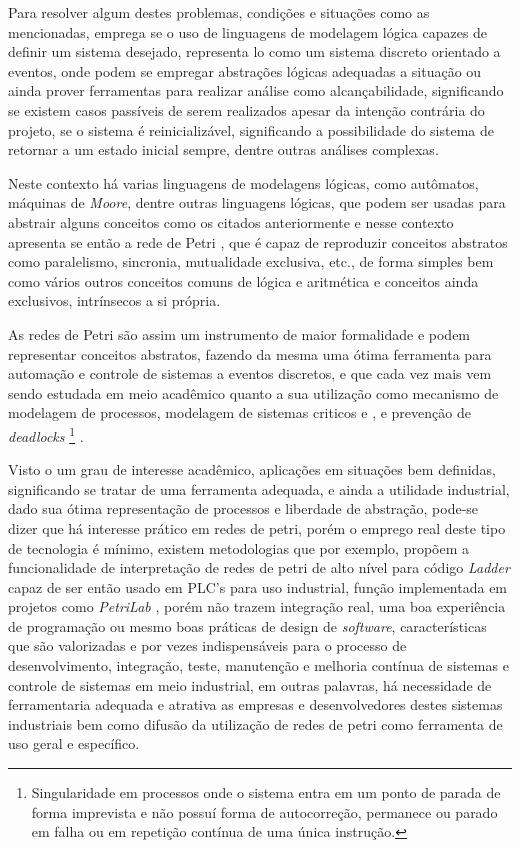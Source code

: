 Para resolver algum destes problemas, condições e situações como as mencionadas, emprega se o uso de linguagens de modelagem lógica capazes de definir um sistema desejado, representa lo como um sistema discreto orientado a eventos, onde podem se empregar abstrações lógicas adequadas a situação ou ainda prover ferramentas para realizar análise como alcançabilidade, significando se existem casos passíveis de serem realizados apesar da intenção contrária do projeto, se o sistema é reinicializável, significando a possibilidade do sistema de retornar a um estado inicial sempre, dentre outras análises complexas.

Neste contexto há varias linguagens de modelagens lógicas, como autômatos, máquinas de \textit{Moore}, dentre outras linguagens lógicas, que podem ser usadas para abstrair alguns conceitos como os citados anteriormente e nesse contexto apresenta se então a rede de Petri \cite{scholarpedia2011}, que é capaz de reproduzir conceitos abstratos como paralelismo, sincronia, mutualidade exclusiva, etc., de forma simples bem como vários outros conceitos comuns de lógica e aritmética e conceitos ainda exclusivos, intrínsecos a si própria. 

As redes de Petri são assim um instrumento de maior formalidade e podem representar conceitos abstratos, fazendo da mesma uma ótima ferramenta para automação e controle de sistemas a eventos discretos, e que cada vez mais vem sendo estudada em meio acadêmico quanto a sua utilização como mecanismo de modelagem de processos, modelagem de sistemas criticos \cite{1702225} e \cite{ghezzi1991unified}, e prevenção de \textit{deadlocks} \footnote{Singularidade em processos onde o sistema entra em um ponto de parada de forma imprevista e não possuí forma de autocorreção, permanece ou parado em falha ou em repetição contínua de uma única instrução.} \cite{kaid2015applications}.

Visto o um grau de interesse acadêmico, aplicações em situações bem definidas, significando se tratar de uma ferramenta adequada, e ainda a utilidade industrial, dado sua ótima representação de processos e liberdade de abstração, pode-se dizer que há interesse prático em redes de petri, porém o emprego real deste tipo de tecnologia é mínimo, existem metodologias \cite{6621049} que por exemplo, propõem a funcionalidade de interpretação de redes de petri de alto nível para código \textit{Ladder} capaz de ser então usado em PLC's para uso industrial, função implementada em projetos como \textit{PetriLab} \cite{de2015petrilab}, porém não trazem integração real, uma boa experiência de programação ou mesmo boas práticas de design de \textit{\textit{software}}, características que são valorizadas e por vezes indispensáveis para o processo de desenvolvimento, integração, teste, manutenção e melhoria contínua de sistemas e controle de sistemas em meio industrial, em outras palavras, há necessidade de ferramentaria adequada e atrativa as empresas e desenvolvedores destes sistemas industriais bem como difusão da utilização de redes de petri como ferramenta de uso geral e específico.

